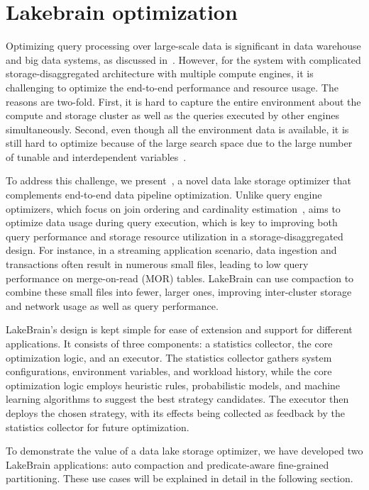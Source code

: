 \section{Lakebrain optimization} 
\label{sec:lakebrain}

Optimizing  query processing over large-scale data is significant in data warehouse and big data systems, as discussed in~\cite{}. However, for the \sys system with
complicated storage-disaggregated architecture with  multiple compute engines, it is challenging to optimize the end-to-end performance and resource usage. The reasons are two-fold. First, it is hard to capture the entire environment about the compute and storage cluster as well as the queries executed by other engines simultaneously. Second, even though all the environment data is available, it is still hard to optimize because of the large search space due to the large number of tunable and interdependent variables~\cite{}.


To address this challenge, we present~\sys, a novel data lake storage optimizer that complements end-to-end data pipeline optimization. Unlike query engine optimizers, which focus on join ordering and cardinality estimation~\cite{}, \sys aims to optimize data usage during query execution, which is key to improving both query performance and storage resource utilization in a storage-disaggregated design. For instance, in a streaming application scenario, data ingestion and transactions often result in numerous small files, leading to low query performance on merge-on-read (MOR) tables. LakeBrain can use compaction to combine these small files into fewer, larger ones, improving inter-cluster storage and network usage as well as query performance.

LakeBrain's design is kept simple for ease of extension and support for different applications. It consists of three components: a statistics collector, the core optimization logic, and an executor. The statistics collector gathers system configurations, environment variables, and workload history, while the core optimization logic employs heuristic rules, probabilistic models, and machine learning algorithms to suggest the best strategy candidates. The executor then deploys the chosen strategy, with its effects being collected as feedback by the statistics collector for future optimization.

To demonstrate the value of a data lake storage optimizer, we have developed two LakeBrain applications: auto compaction and predicate-aware fine-grained partitioning. These use cases will be explained in detail in the following section.

